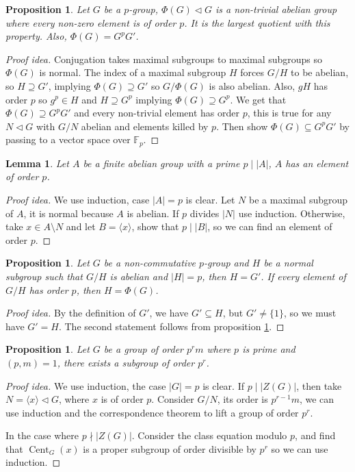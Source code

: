 \documentclass[paper=a4, fontsize=12pt]{scrartcl} %
\newtheorem{prop}[thm]{Proposition}
\newtheorem{lem}[thm]{Lemma}
\theoremstyle{definition}
\theoremstyle{remark}
\newcommand{\F}{\mathbb{F}}
\DeclareMathOperator{\cent}{Cent}
\numberwithin{equation}{section} %
\numberwithin{figure}{section} %
\numberwithin{table}{section} %
\begin{document}
\begin{prop}\label{prop:fratt}
	Let $G$ be a $p$-group, $\Phi(G) \lhd G$ is a non-trivial abelian group where every non-zero element is of order $p$. It is the largest quotient with this property. Also, $\Phi(G) = G^pG'$.
\end{prop}
\begin{proof}[Proof idea]
	Conjugation takes maximal subgroups to maximal subgroups so $\Phi(G)$ is normal. The index of a maximal subgroup $H$ forces $G/H$ to be abelian, so $H \supseteq G'$, implying $\Phi(G) \supseteq G'$ so $G/\Phi(G)$ is also abelian. Also, $gH$ has order $p$ so $g^p \in H$ and $H \supseteq G^p$ implying $\Phi(G) \supseteq G^p$. We get that $\Phi(G) \supseteq G^pG'$ and every non-trivial element has order $p$, this is true for any $N \lhd G$ with $G/N$ abelian and elements killed by $p$. Then show $\Phi(G) \subseteq G^pG'$ by passing to a vector space over $\F_p$.
\end{proof}
\begin{lem}
	Let $A$ be a finite abelian group with a prime $p \mid |A|$, $A$ has an element of order $p$.
\end{lem}
\begin{proof}[Proof idea]
	We use induction, case $|A| = p$ is clear. Let $N$ be a maximal subgroup of $A$, it is normal because $A$ is abelian. If $p$ divides $|N|$ use induction. Otherwise, take $x \in A \setminus N$ and let $B = \langle x \rangle$, show that $p \mid |B|$, so we can find an element of order $p$.
\end{proof}
\begin{prop}
	Let $G$ be a non-commutative $p$-group and $H$ be a normal subgroup such that $G/H$ is abelian and $|H| = p$, then $H = G'$. If every element of $G/H$ has order $p$, then $H = \Phi(G)$.
\end{prop}
\begin{proof}[Proof idea]
	By the definition of $G'$, we have $G' \subseteq H$, but $G' \neq \{1\}$, so we must have $G' = H$. The second statement follows from proposition \ref{prop:fratt}.
\end{proof}
\begin{prop}
	Let $G$ be a group of order $p^rm$ where $p$ is prime and $(p,m) = 1$, there exists a subgroup of order $p^r$.
\end{prop}
\begin{proof}[Proof idea]
	We use induction, the case $|G| = p$ is clear. If $p \mid |Z(G)|$, then take $N = \langle x \rangle \lhd G$, where $x$ is of order $p$. Consider $G/N$, its order is $p^{r-1}m$, we can use induction and the correspondence theorem to lift a group of order $p^r$.
	
	In the case where $p \nmid |Z(G)|$. Consider the class equation modulo $p$, and find that $\cent_G(x)$ is a proper subgroup of order divisible by $p^r$ so we can use induction.
\end{proof}
\end{document}
